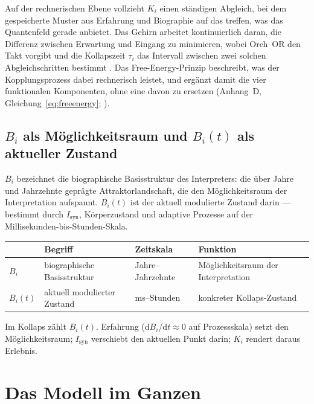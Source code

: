 \documentclass[11pt,a4paper]{article}
\begin{document}
Auf der rechnerischen Ebene vollzieht $K_i$ einen ständigen Abgleich,
bei dem gespeicherte Muster aus Erfahrung und Biographie auf das treffen,
was das Quantenfeld gerade anbietet. Das Gehirn arbeitet kontinuierlich
daran, die Differenz zwischen Erwartung und Eingang zu minimieren, wobei
Orch~OR den Takt vorgibt und die Kollapszeit $\tau_i$ das Intervall zwischen
zwei solchen Abgleichschritten bestimmt \citep{wiest2025active}. Das
Free-Energy-Prinzip beschreibt, was der Kopplungsprozess dabei rechnerisch
leistet, und ergänzt damit die vier funktionalen Komponenten, ohne eine davon
zu ersetzen (Anhang~D, Gleichung~\eqref{eq:freeenergy}; \citealt{friston2010}).

\subsection*{$B_i$ als Möglichkeitsraum und $B_i(t)$ als aktueller Zustand}

$B_i$ bezeichnet die biographische Basisstruktur des Interpreters: die über
Jahre und Jahrzehnte geprägte Attraktorlandschaft, die den Möglichkeitsraum der
Interpretation aufspannt. $B_i(t)$ ist der aktuell modulierte Zustand darin —
bestimmt durch $I_{\mathrm{syn}}$, Körperzustand und adaptive Prozesse auf der
Millisekunden-bis-Stunden-Skala.

\begin{center}\small
\begin{tabular}{@{}llll@{}}
\toprule
 & Begriff & Zeitskala & Funktion \\
\midrule
$B_i$ & biographische Basisstruktur & Jahre–Jahrzehnte & Möglichkeitsraum der Interpretation \\
$B_i(t)$ & aktuell modulierter Zustand & ms–Stunden & konkreter Kollaps-Zustand \\
\bottomrule
\end{tabular}
\end{center}

Im Kollaps zählt $B_i(t)$. Erfahrung (d$B_i$/d$t \approx 0$ auf Prozessskala)
setzt den Möglichkeitsraum; $I_{\mathrm{syn}}$ verschiebt den aktuellen Punkt darin;
$K_i$ rendert daraus Erlebnis.

\section{Das Modell im Ganzen}
\label{sec:modell}
\end{document}
